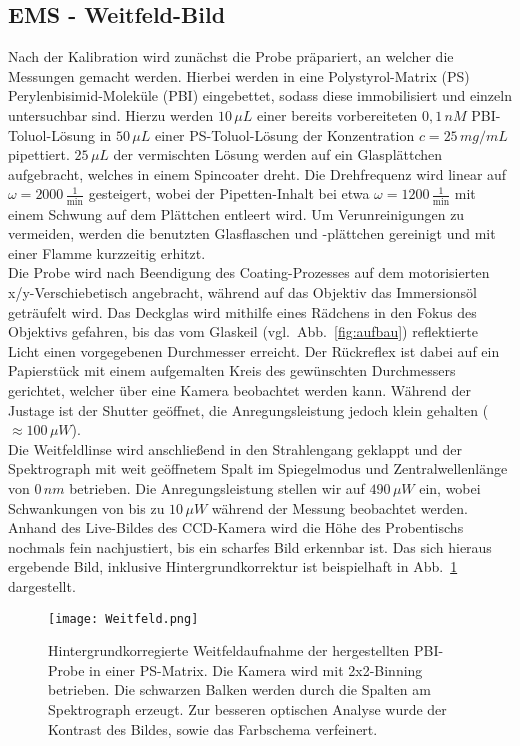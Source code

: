 \subsection{\label{subsec:A2}EMS - Weitfeld-Bild}
Nach der Kalibration wird zunächst die Probe präpariert, 
an welcher die Messungen gemacht werden. Hierbei werden in eine Polystyrol-Matrix (PS) 
Perylenbisimid-Moleküle (PBI) eingebettet, sodass diese immobilisiert und einzeln untersuchbar sind.
Hierzu werden $10\,\si{\mu L}$ einer bereits vorbereiteten $0,1\,\si{nM}$ PBI-Toluol-Lösung in 
$50\,\si{\mu L}$ einer PS-Toluol-Lösung der Konzentration $c=25\,\si{mg/mL}$ pipettiert. 
$25\,\si{\mu L}$ der vermischten Lösung werden auf ein Glasplättchen aufgebracht, welches in 
einem Spincoater dreht. Die Drehfrequenz wird linear auf $\omega=2000\,\si{\frac{1}{\text{min}}}$ 
gesteigert, wobei der Pipetten-Inhalt bei etwa $\omega=1200\,\si{\frac{1}{\text{min}}}$ mit 
einem Schwung auf dem Plättchen entleert wird. Um Verunreinigungen zu vermeiden, werden die benutzten 
Glasflaschen und -plättchen gereinigt und mit einer Flamme kurzzeitig erhitzt. \\
Die Probe wird nach Beendigung des Coating-Prozesses auf dem motorisierten x/y-Verschiebetisch angebracht, 
während auf das Objektiv das Immersionsöl geträufelt wird. Das Deckglas wird mithilfe eines Rädchens 
in den Fokus des Objektivs gefahren, bis das vom Glaskeil (vgl.~Abb.~\ref{fig:aufbau}) reflektierte Licht
einen vorgegebenen Durchmesser erreicht. Der Rückreflex ist dabei auf ein Papierstück mit einem aufgemalten 
Kreis des gewünschten Durchmessers gerichtet, welcher über eine Kamera beobachtet werden kann. 
Während der Justage ist der Shutter geöffnet, die Anregungsleistung jedoch klein gehalten 
($\approx 100\,\si{\mu W}$). \\
Die Weitfeldlinse wird anschließend in den Strahlengang geklappt und der Spektrograph mit weit 
geöffnetem Spalt im Spiegelmodus und Zentralwellenlänge von $0\,\si{nm}$ betrieben. 
Die Anregungsleistung stellen wir auf $490\,\si{\mu W}$ ein, 
wobei Schwankungen von bis zu $10\,\si{\mu W}$ während der Messung beobachtet werden. 
Anhand des Live-Bildes des CCD-Kamera wird die Höhe des Probentischs nochmals fein nachjustiert, 
bis ein scharfes Bild erkennbar ist. Das sich hieraus ergebende Bild, inklusive Hintergrundkorrektur
ist beispielhaft in Abb.~\ref{fig:weitfeldbild} dargestellt. 
\begin{figure}[h!]
    \centering
    \texttt{[image: Weitfeld.png]}
    \caption{\label{fig:weitfeldbild}Hintergrundkorregierte Weitfeldaufnahme der hergestellten 
    PBI-Probe in einer PS-Matrix. Die Kamera wird mit 2x2-Binning betrieben. Die schwarzen Balken 
    werden durch die Spalten am Spektrograph erzeugt. Zur besseren optischen Analyse wurde 
    der Kontrast des Bildes, sowie das Farbschema verfeinert.}
\end{figure}\FloatBarrier
